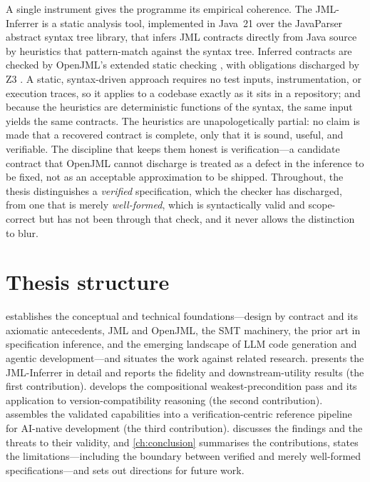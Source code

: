 A single instrument gives the programme its empirical coherence. The JML-Inferrer
is a static analysis tool, implemented in Java~21 over the JavaParser abstract
syntax tree library, that infers JML contracts directly from Java source by
heuristics that pattern-match against the syntax tree. Inferred contracts are
checked by OpenJML's extended static checking \citep{cok2014openjml}, with
obligations discharged by Z3 \citep{demoura2008z3}. A static, syntax-driven
approach requires no test inputs, instrumentation, or execution traces, so it
applies to a codebase exactly as it sits in a repository; and because the
heuristics are deterministic functions of the syntax, the same input yields the
same contracts. The heuristics are unapologetically partial: no claim is made that
a recovered contract is complete, only that it is sound, useful, and verifiable.
The discipline that keeps them honest is verification---a candidate contract that
OpenJML cannot discharge is treated as a defect in the inference to be fixed, not
as an acceptable approximation to be shipped. Throughout, the thesis distinguishes
a \emph{verified} specification, which the checker has discharged, from one that is
merely \emph{well-formed}, which is syntactically valid and scope-correct but has
not been through that check, and it never allows the distinction to blur.

\section{Thesis structure}

 establishes the conceptual and technical foundations---design
by contract and its axiomatic antecedents, JML and OpenJML, the SMT machinery, the
prior art in specification inference, and the emerging landscape of LLM code
generation and agentic development---and situates the work against related
research.  presents the JML-Inferrer in detail and reports the
fidelity and downstream-utility results (the first contribution).
 develops the compositional weakest-precondition pass and
its application to version-compatibility reasoning (the second contribution).
 assembles the validated capabilities into a
verification-centric reference pipeline for AI-native development (the third
contribution).  discusses the findings and the threats to
their validity, and \cref{ch:conclusion} summarises the contributions, states the
limitations---including the boundary between verified and merely well-formed
specifications---and sets out directions for future work.
